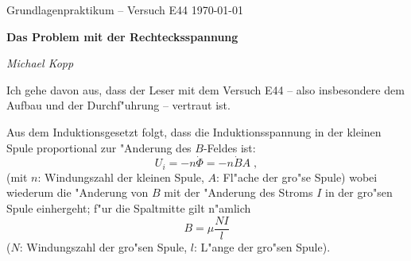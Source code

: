 \message{ !name(uebertr01.tex)}\documentclass[a4paper,12pt,draft]{article}
\newcommand{\abs}[0]{\bigskip\noindent}
\begin{document}




\newcommand{\NAME}{Michael Kopp}
\newcommand{\FACH}{Grundlagenpraktikum -- Versuch E44}
\newcommand{\TITEL}{Das Problem mit der Rechtecksspannung}
\newcommand{\DATUM}{\today}


\pagestyle{plain} 




\sloppy

\begin{center}
\FACH
\hfill
\DATUM
\end{center}

\vspace{-5mm} %

\begin{center}
  \begin{Large}
 \textbf{\TITEL}
  \end{Large}
\end{center}

\vspace{-3mm}

\begin{center}
\hrulefill
\quad 
\textit{\NAME}
\,
\hrulefill
\end{center}
 
 

\noindent
Ich gehe davon aus, dass der Leser mit dem Versuch E44 -- also
insbesondere dem Aufbau und der Durchf"uhrung -- vertraut ist.

\abs
Aus dem Induktionsgesetzt folgt, dass die Induktionsspannung in der
kleinen Spule proportional zur "Anderung des $B$-Feldes ist:
\begin{equation}
  \label{eq:1}
  U_i = - n \dot \Phi = - n \dot B A \;,
\end{equation}
(mit $n$: Windungszahl der kleinen Spule, $A$: Fl"ache der gro"se
Spule) wobei wiederum die "Anderung von $B$ mit der "Anderung des Stroms $I$ in
der gro"sen Spule einhergeht; f"ur die Spaltmitte gilt n"amlich
\begin{equation}
  \label{eq:2}
  B = \mu \frac{ N I }{l}
\end{equation}
($N$: Windungszahl der gro"sen Spule, $l$: L"ange der gro"sen Spule).
\end{document}
